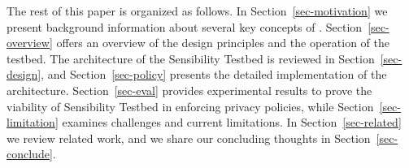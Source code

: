 The rest of this paper is organized as follows. In Section~\ref{sec-motivation} we
present background information about several key concepts of \sysname. 
Section~\ref{sec-overview} offers an overview of the design principles 
and the operation of the testbed. The architecture of the Sensibility Testbed 
is reviewed in Section~\ref{sec-design}, and Section~\ref{sec-policy} 
presents the detailed implementation of the architecture. 
Section~\ref{sec-eval} provides experimental results to prove the
viability of Sensibility Testbed in enforcing privacy policies, while
Section~\ref{sec-limitation} examines challenges and current limitations. 
In Section~\ref{sec-related} we review related work,
and we share our concluding thoughts in Section~\ref{sec-conclude}.

